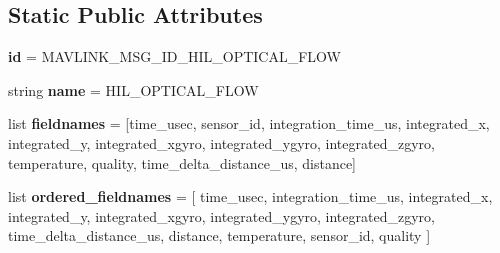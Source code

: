 \subsection*{Static Public Attributes}
\begin{DoxyCompactItemize}
\item 
\mbox{\label{classpymavlink_1_1dialects_1_1v10_1_1MAVLink__hil__optical__flow__message_ae889383de0c55b7e9dfca6c1ad147ae6}} 
{\bfseries id} = M\+A\+V\+L\+I\+N\+K\+\_\+\+M\+S\+G\+\_\+\+I\+D\+\_\+\+H\+I\+L\+\_\+\+O\+P\+T\+I\+C\+A\+L\+\_\+\+F\+L\+OW
\item 
\mbox{\label{classpymavlink_1_1dialects_1_1v10_1_1MAVLink__hil__optical__flow__message_a4193cc989c8961679c93e20bf6428761}} 
string {\bfseries name} = \textquotesingle{}H\+I\+L\+\_\+\+O\+P\+T\+I\+C\+A\+L\+\_\+\+F\+L\+OW\textquotesingle{}
\item 
\mbox{\label{classpymavlink_1_1dialects_1_1v10_1_1MAVLink__hil__optical__flow__message_a39590a682b8446e6327c6790b8e073d7}} 
list {\bfseries fieldnames} = \mbox{[}\textquotesingle{}time\+\_\+usec\textquotesingle{}, \textquotesingle{}sensor\+\_\+id\textquotesingle{}, \textquotesingle{}integration\+\_\+time\+\_\+us\textquotesingle{}, \textquotesingle{}integrated\+\_\+x\textquotesingle{}, \textquotesingle{}integrated\+\_\+y\textquotesingle{}, \textquotesingle{}integrated\+\_\+xgyro\textquotesingle{}, \textquotesingle{}integrated\+\_\+ygyro\textquotesingle{}, \textquotesingle{}integrated\+\_\+zgyro\textquotesingle{}, \textquotesingle{}temperature\textquotesingle{}, \textquotesingle{}quality\textquotesingle{}, \textquotesingle{}time\+\_\+delta\+\_\+distance\+\_\+us\textquotesingle{}, \textquotesingle{}distance\textquotesingle{}\mbox{]}
\item 
\mbox{\label{classpymavlink_1_1dialects_1_1v10_1_1MAVLink__hil__optical__flow__message_a9043333fc40065ab097536bf1ca199d7}} 
list {\bfseries ordered\+\_\+fieldnames} = \mbox{[} \textquotesingle{}time\+\_\+usec\textquotesingle{}, \textquotesingle{}integration\+\_\+time\+\_\+us\textquotesingle{}, \textquotesingle{}integrated\+\_\+x\textquotesingle{}, \textquotesingle{}integrated\+\_\+y\textquotesingle{}, \textquotesingle{}integrated\+\_\+xgyro\textquotesingle{}, \textquotesingle{}integrated\+\_\+ygyro\textquotesingle{}, \textquotesingle{}integrated\+\_\+zgyro\textquotesingle{}, \textquotesingle{}time\+\_\+delta\+\_\+distance\+\_\+us\textquotesingle{}, \textquotesingle{}distance\textquotesingle{}, \textquotesingle{}temperature\textquotesingle{}, \textquotesingle{}sensor\+\_\+id\textquotesingle{}, \textquotesingle{}quality\textquotesingle{} \mbox{]}

\end{DoxyCompactItemize}

